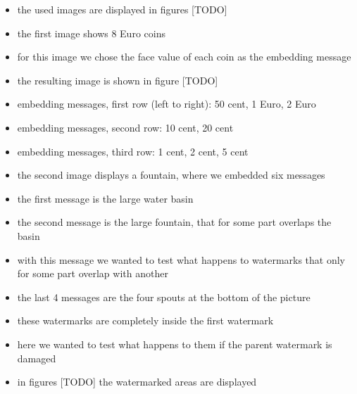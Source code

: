 \begin{itemize}
    \item the used images are displayed in figures [TODO]
    \item the first image shows 8 Euro coins
    \item for this image we chose the face value of each coin as the embedding message
    \item the resulting image is shown in figure [TODO]
    \item embedding messages, first row (left to right): 50 cent, 1 Euro, 2 Euro
    \item embedding messages, second row: 10 cent, 20 cent
    \item embedding messages, third row: 1 cent, 2 cent, 5 cent

    \item the second image displays a fountain, where we embedded six messages
    \item the first message is the large water basin
    \item the second message is the large fountain, that for some part overlaps the basin
    \item with this message we wanted to test what happens to watermarks that only for some part overlap with another
    \item the last 4 messages are the four spouts at the bottom of the picture
    \item these watermarks are completely inside the first watermark
    \item here we wanted to test what happens to them if the parent watermark is damaged
    
    \item in figures [TODO] the watermarked areas are displayed
\end{itemize}



